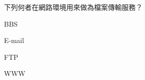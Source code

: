 \ifx\ntpcNinetyTwo\undefined[92學年基北區] \fi
下列何者在網路環境用來做為檔案傳輸服務？
  \begin{optionlist}
  \item BBS
  \item E-mail
  \item FTP\label{ntpc-92-a18}
  \item WWW
  \end{optionlist}